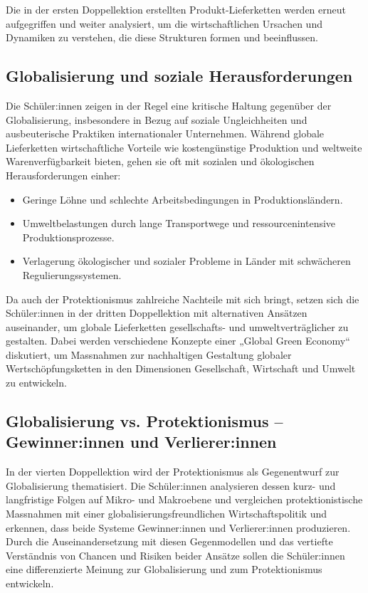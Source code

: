 Die in der ersten Doppellektion erstellten Produkt-Lieferketten werden erneut aufgegriffen und weiter analysiert, um die wirtschaftlichen Ursachen und Dynamiken zu verstehen, die diese Strukturen formen und beeinflussen.

\subsection{Globalisierung und soziale Herausforderungen}
Die Schüler:innen zeigen in der Regel eine kritische Haltung gegenüber der Globalisierung, insbesondere in Bezug auf soziale Ungleichheiten und ausbeuterische Praktiken internationaler Unternehmen. Während globale Lieferketten wirtschaftliche Vorteile wie kostengünstige Produktion und weltweite Warenverfügbarkeit bieten, gehen sie oft mit sozialen und ökologischen Herausforderungen einher:
\begin{itemize}
    \item Geringe Löhne und schlechte Arbeitsbedingungen in Produktionsländern.
    \item Umweltbelastungen durch lange Transportwege und ressourcenintensive Produktionsprozesse.
    \item Verlagerung ökologischer und sozialer Probleme in Länder mit schwächeren Regulierungssystemen.
\end{itemize}

Da auch der Protektionismus zahlreiche Nachteile mit sich bringt, setzen sich die Schüler:innen in der dritten Doppellektion mit alternativen Ansätzen auseinander, um globale Lieferketten gesellschafts- und umweltverträglicher zu gestalten. Dabei werden verschiedene Konzepte einer „Global Green Economy“ diskutiert, um Massnahmen zur nachhaltigen Gestaltung globaler Wertschöpfungsketten in den Dimensionen Gesellschaft, Wirtschaft und Umwelt zu entwickeln.

\subsection{Globalisierung vs. Protektionismus -- Gewinner:innen und Verlierer:innen}
In der vierten Doppellektion wird der Protektionismus als Gegenentwurf zur Globalisierung thematisiert. Die Schüler:innen analysieren dessen kurz- und langfristige Folgen auf Mikro- und Makroebene und vergleichen protektionistische Massnahmen mit einer globalisierungsfreundlichen Wirtschaftspolitik und erkennen, dass beide Systeme Gewinner:innen und Verlierer:innen produzieren. Durch die Auseinandersetzung mit diesen Gegenmodellen und das vertiefte Verständnis von Chancen und Risiken beider Ansätze sollen die Schüler:innen eine differenzierte Meinung zur Globalisierung und zum Protektionismus entwickeln.

